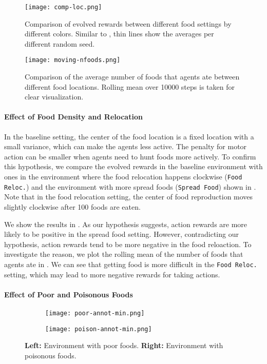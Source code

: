 \begin{figure}[ht]
  \centering
  \texttt{[image: comp-loc.png]}
  \caption{
    Comparison of evolved rewards between different food settings by different colors.
    Similar to , thin lines show the averages per different random seed.
  }\label{figure:result-foodloc}
\end{figure}

\begin{figure}[!htb]
  \centering
  \texttt{[image: moving-nfoods.png]}
  \caption{
    Comparison of the average number of foods that agents ate between different food locations.
    Rolling mean over 10000 steps is taken for clear visualization.
  }\label{figure:result-nfood}
\end{figure}

\paragraph{Effect of Food Density and Relocation}
In the baseline setting, the center of the food location is a fixed location with a small variance, which can make the agents less active. The penalty for motor action can be smaller when agents need to hunt foods more actively. To confirm this hypothesis, we compare the evolved rewards in the baseline environment with ones in the environment where the food relocation happens clockwise (\texttt{Food Reloc.}) and the environment with more spread foods (\texttt{Spread Food}) shown in . Note that in the food relocation setting, the center of food reproduction moves slightly clockwise after 100 foods are eaten.

We show the results in . As our hypothesis suggests, action rewards are more likely to be positive in the spread food setting. However, contradicting our hypothesis, action rewards tend to be more negative in the food reloaction. To investigate the reason, we plot the rolling mean of the number of foods that agents ate in . We can see that getting food is more difficult in the \texttt{Food Reloc.} setting, which may lead to more negative rewards for taking actions.

\paragraph{Effect of Poor and Poisonous Foods}

\begin{figure}[t]
  \begin{subfigure}[t]{4cm}
    \centering
    \texttt{[image: poor-annot-min.png]}
  \end{subfigure}
  \begin{subfigure}[t]{4cm}
    \centering
    \texttt{[image: poison-annot-min.png]}
  \end{subfigure}
  \caption{
    \textbf{Left:} Environment with poor foods.
    \textbf{Right:} Environment with poisonous foods.
  }\label{figure:pp}
\end{figure}

